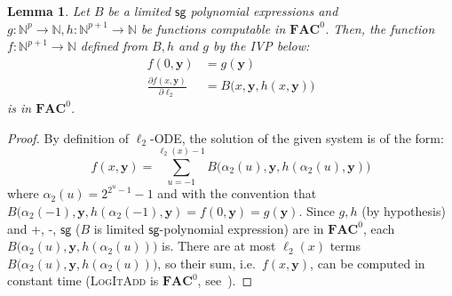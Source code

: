 \documentclass[11pt, oneside]{article}
\newcommand{\fun}[1]{\mathsf{#1}}
\newcommand{\sB}{B}
\newcommand{\Nat}{\mathbb{N}}
\newcommand{\AC}{\mathbf{FAC}}
\newcommand{\tu}[1]{\mathbf{#1}}
\newtheorem{lemma}{Lemma}
\theoremstyle{definition}
\begin{document}
\begin{toappendix}
%
%
\begin{lemma}\label{lemma:logitadd-original-3016}
    Let $\sB$ be a limited $\fun{sg}$ polynomial expressions and $g:\Nat^{p} \to \Nat, h:\Nat^{p+1}\to \Nat$ be functions computable in $\AC^0$.
    Then, the function $f:\Nat^{p+1} \to \Nat$ defined from $\sB, h$ and $g$ by the IVP below:
    \begin{align*}
        f(0, \tu y) &= g(\tu y) \\
        \frac{\partial f(x, \tu y)}{\partial \ell_2} &= \sB\big(x, \tu y, h(x, \tu y)\big)
    \end{align*}
    is in $\AC^0$.
\end{lemma}
%
\begin{proof}
    By definition of $\ell_2$-ODE, the solution of the given system is of the form:
    $$
    f(x, \tu y) = \sum^{\ell_2(x)-1}_{u=-1} \sB\big(\alpha_2(u), \tu y, h(\alpha_2(u), \tu y)\big)
    $$
    where $\alpha_2(u)=2^{2^u-1}-1$ and with the convention that $\sB(\alpha_2(-1), \tu y, h(\alpha_2(-1), \tu y)=f(0, \tu y)= g(\tu y)$.
    Since $g, h$ (by hypothesis) and +, -, $\fun{sg}$ ($\sB$ is limited $\fun{sg}$-polynomial expression) are in $\AC^0$, each $\sB\big(\alpha_2(u), \tu y, h(\alpha_2(u))\big)$ is.
    There are at most $\ell_2(x)$ terms $\sB\big(\alpha_2(u), \tu y, h(\alpha_2(u))\big)$, so their sum, i.e.~$f(x, \tu y)$, can be computed in constant time (\textsc{LogItAdd} is $\AC^0$, see~\cite{Vollmer}). 
\end{proof}



\end{toappendix}
\end{document}
